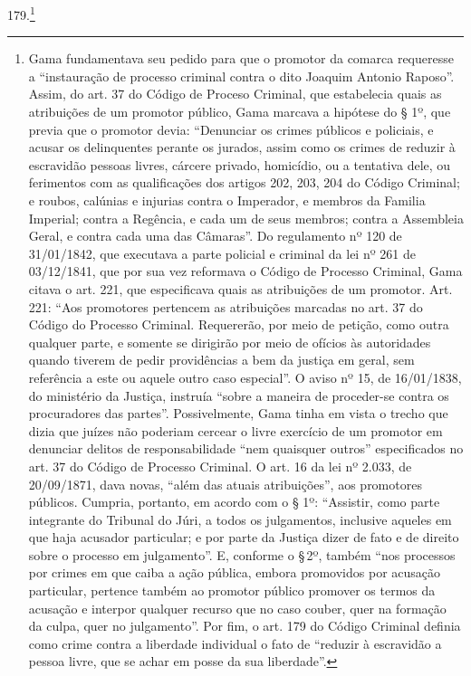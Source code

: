 179.\footnote{Gama fundamentava seu pedido para que o promotor da
  comarca requeresse a ``instauração de processo criminal contra o dito
  Joaquim Antonio Raposo''. Assim, do art. 37 do Código de Proceso
  Criminal, que estabelecia quais as atribuições de um promotor público,
  Gama marcava a hipótese do § 1º, que previa que o promotor devia:
  ``Denunciar os crimes públicos e policiais, e acusar os delinquentes
  perante os jurados, assim como os crimes de reduzir à escravidão
  pessoas livres, cárcere privado, homicídio, ou a tentativa dele, ou
  ferimentos com as qualificações dos artigos 202, 203, 204 do Código
  Criminal; e roubos, calúnias e injurias contra o Imperador, e membros
  da Familia Imperial; contra a Regência, e cada um de seus membros;
  contra a Assembleia Geral, e contra cada uma das Câmaras''. Do
  regulamento nº 120 de 31/01/1842, que executava a parte policial e
  criminal da lei nº 261 de 03/12/1841, que por sua vez reformava o
  Código de Processo Criminal, Gama citava o art. 221, que especificava
  quais as atribuições de um promotor. Art. 221: ``Aos promotores
  pertencem as atribuições marcadas no art. 37 do Código do Processo
  Criminal. Requererão, por meio de petição, como outra qualquer parte,
  e somente se dirigirão por meio de ofícios às autoridades quando
  tiverem de pedir providências a bem da justiça em geral, sem
  referência a este ou aquele outro caso especial''. O aviso nº 15, de
  16/01/1838, do ministério da Justiça, instruía ``sobre a maneira de
  proceder-se contra os procuradores das partes''. Possivelmente, Gama
  tinha em vista o trecho que dizia que juízes não poderiam cercear o
  livre exercício de um promotor em denunciar delitos de
  responsabilidade ``nem quaisquer outros'' especificados no art. 37 do
  Código de Processo Criminal. O art. 16 da lei nº 2.033, de 20/09/1871,
  dava novas, ``além das atuais atribuições'', aos promotores públicos.
  Cumpria, portanto, em acordo com o § 1º: ``Assistir, como parte
  integrante do Tribunal do Júri, a todos os julgamentos, inclusive
  aqueles em que haja acusador particular; e por parte da Justiça dizer
  de fato e de direito sobre o processo em julgamento''. E, conforme o §\,2º, também ``nos processos por crimes em que caiba a ação pública,
  embora promovidos por acusação particular, pertence também ao promotor
  público promover os termos da acusação e interpor qualquer recurso que
  no caso couber, quer na formação da culpa, quer no julgamento''. Por
  fim, o art. 179 do Código Criminal definia como crime contra a
  liberdade individual o fato de ``reduzir à escravidão a pessoa livre,
  que se achar em posse da sua liberdade''.}

